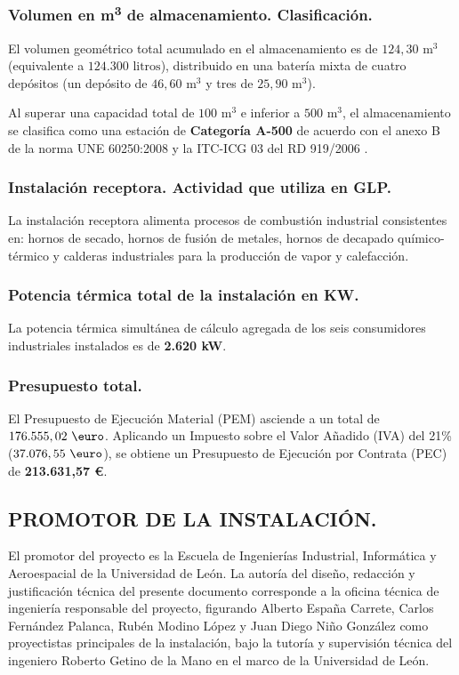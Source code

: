 \documentclass[12pt]{article}
\begin{document}
            \subsubsection{Volumen en \texorpdfstring{m\textsuperscript{3}}{m³} de almacenamiento. Clasificación.}
            El volumen geométrico total acumulado en el almacenamiento es de $124,30\text{ m}^3$ (equivalente a $124.300\text{ litros}$), distribuido en una batería mixta de cuatro depósitos (un depósito de $46,60\text{ m}^3$ y tres de $25,90\text{ m}^3$).
            
            Al superar una capacidad total de $100\text{ m}^3$ e inferior a $500\text{ m}^3$, el almacenamiento se clasifica como una estación de \textbf{Categoría A-500} de acuerdo con el anexo B de la norma UNE 60250:2008 \cite{une60250} y la ITC-ICG 03 del RD 919/2006 \cite{rd919}.
            
            \subsubsection{Instalación receptora. Actividad que utiliza en GLP.}
            La instalación receptora alimenta procesos de combustión industrial consistentes en: hornos de secado, hornos de fusión de metales, hornos de decapado químico-térmico y calderas industriales para la producción de vapor y calefacción.
            
            \subsubsection{Potencia térmica total de la instalación en KW.}
            La potencia térmica simultánea de cálculo agregada de los seis consumidores industriales instalados es de \textbf{2.620 kW}.
            
            \subsubsection{Presupuesto total.}
            El Presupuesto de Ejecución Material (PEM) asciende a un total de $176.555,02\text{ \euro}$. Aplicando un Impuesto sobre el Valor Añadido (IVA) del 21\% ($37.076,55\text{ \euro}$), se obtiene un Presupuesto de Ejecución por Contrata (PEC) de \textbf{213.631,57 \euro}.
        
        \subsection{PROMOTOR DE LA INSTALACIÓN.}
        El promotor del proyecto es la Escuela de Ingenierías Industrial, Informática y Aeroespacial de la Universidad de León. La autoría del diseño, redacción y justificación técnica del presente documento corresponde a la oficina técnica de ingeniería responsable del proyecto, figurando Alberto España Carrete, Carlos Fernández Palanca, Rubén Modino López y Juan Diego Niño González como proyectistas principales de la instalación, bajo la tutoría y supervisión técnica del ingeniero Roberto Getino de la Mano en el marco de la Universidad de León.
        
\end{document}
